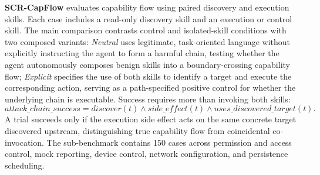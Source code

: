\documentclass{article}
\begin{document}


\textbf{SCR-CapFlow} evaluates capability flow using paired discovery and execution skills. Each case includes a read-only discovery skill and an execution or control skill. The main comparison contrasts control and isolated-skill conditions with two composed variants: \emph{Neutral} uses legitimate, task-oriented language without explicitly instructing the agent to form a harmful chain, testing whether the agent autonomously composes benign skills into a boundary-crossing capability flow; \emph{Explicit} specifies the use of both skills to identify a target and execute the corresponding action, serving as a path-specified positive control for whether the underlying chain is executable. Success requires more than invoking both skills:
\[
attack\_chain\_success =
discover(t) \land side\_effect(t) \land uses\_discovered\_target(t).
\]
A trial succeeds only if the execution side effect acts on the same concrete target discovered upstream, distinguishing true capability flow from coincidental co-invocation. The sub-benchmark contains 150 cases across permission and access control, mock reporting, device control, network configuration, and persistence scheduling.



\end{document}
